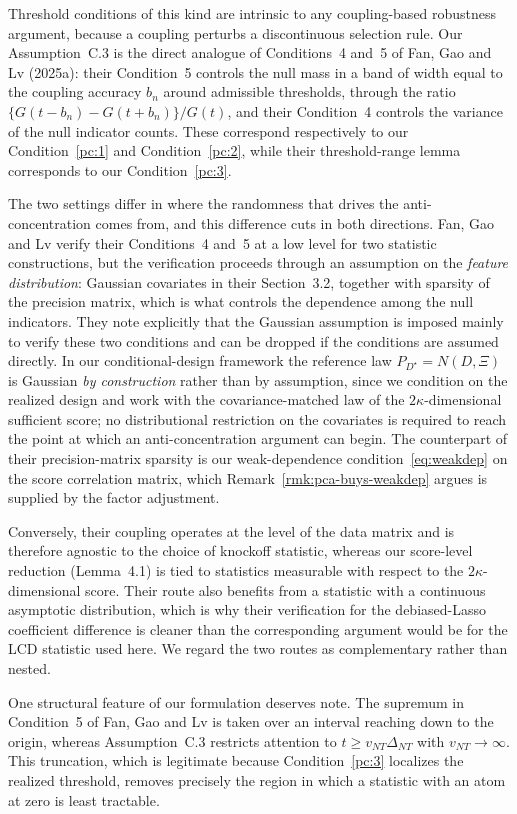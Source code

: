 \begin{remark}
\label{rmk:ark-comparison}
Threshold conditions of this kind are intrinsic to any coupling-based
robustness argument, because a coupling perturbs a discontinuous selection
rule.  Our Assumption~C.3 is the direct analogue of Conditions~4 and~5 of
Fan, Gao and Lv (2025a): their Condition~5 controls the null mass in a band of
width equal to the coupling accuracy $b_n$ around admissible thresholds,
through the ratio $\{G(t-b_n) - G(t+b_n)\}/G(t)$, and their Condition~4
controls the variance of the null indicator counts.  These correspond
respectively to our Condition~\ref{pc:1} and Condition~\ref{pc:2}, while their
threshold-range lemma corresponds to our Condition~\ref{pc:3}.

The two settings differ in where the randomness that drives the
anti-concentration comes from, and this difference cuts in both directions.
Fan, Gao and Lv verify their Conditions~4 and~5 at a low level for two
statistic constructions, but the verification proceeds through an assumption
on the \emph{feature distribution}: Gaussian covariates in their Section~3.2,
together with sparsity of the precision matrix, which is what controls the
dependence among the null indicators.  They note explicitly that the Gaussian
assumption is imposed mainly to verify these two conditions and can be dropped
if the conditions are assumed directly.  In our conditional-design framework
the reference law $P_{D^\star} = N(D,\Xi)$ is Gaussian \emph{by construction}
rather than by assumption, since we condition on the realized design and work
with the covariance-matched law of the $2\kappa$-dimensional sufficient score;
no distributional restriction on the covariates is required to reach the point
at which an anti-concentration argument can begin.  The counterpart of their
precision-matrix sparsity is our weak-dependence
condition~\eqref{eq:weakdep} on the score correlation matrix, which
Remark~\ref{rmk:pca-buys-weakdep} argues is supplied by the factor adjustment.

Conversely, their coupling operates at the level of the data matrix and is
therefore agnostic to the choice of knockoff statistic, whereas our
score-level reduction (Lemma~4.1) is tied to statistics measurable with respect
to the $2\kappa$-dimensional score.  Their route also benefits from a statistic
with a continuous asymptotic distribution, which is why their verification for
the debiased-Lasso coefficient difference is cleaner than the corresponding
argument would be for the LCD statistic used here.  We regard the two routes as
complementary rather than nested.

One structural feature of our formulation deserves note.  The supremum in
Condition~5 of Fan, Gao and Lv is taken over an interval reaching down to the
origin, whereas Assumption~C.3 restricts attention to $t \ge v_{NT}\Delta_{NT}$
with $v_{NT} \to \infty$.  This truncation, which is legitimate because
Condition~\ref{pc:3} localizes the realized threshold, removes precisely the
region in which a statistic with an atom at zero is least tractable.
\end{remark}
